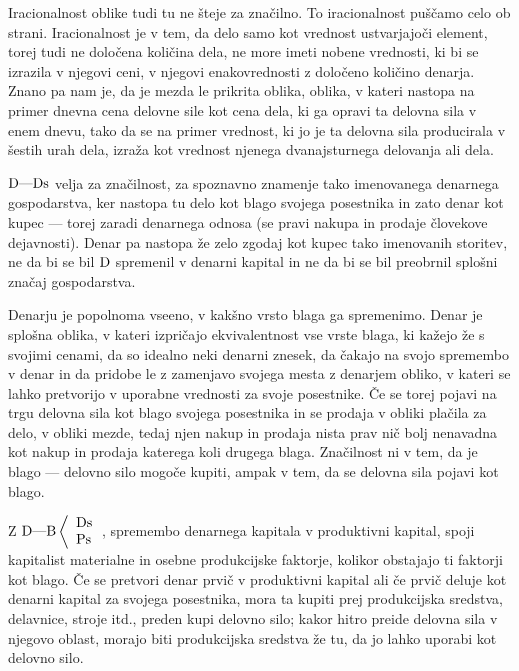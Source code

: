 \documentclass[kapital_02.tex]{subfiles}
\begin{document}
Iracionalnost oblike tudi tu ne šteje za značilno. To iracionalnost puščamo celo ob strani. Iracionalnost je v tem, da delo samo kot vrednost ustvarjajoči element, torej tudi ne določena količina dela, ne more imeti nobene vrednosti, ki bi se izrazila v njegovi ceni, v njegovi enakovrednosti z določeno količino denarja. Znano pa nam je, da je mezda le prikrita oblika, oblika, v kateri nastopa na primer dnevna cena delovne sile kot cena dela, ki ga opravi ta delovna sila v enem dnevu, tako da se na primer vrednost, ki jo je ta delovna sila producirala v šestih urah dela, izraža kot vrednost njenega dvanajsturnega delovanja ali dela.

\( \textrm{D}\textrm{---}\textrm{Ds} \) velja za značilnost, za spoznavno znamenje tako imenovanega denarnega gospodarstva, ker nastopa tu delo kot blago svojega posestnika in zato denar kot kupec --- torej zaradi denarnega odnosa (se pravi nakupa in prodaje človekove dejavnosti). Denar pa nastopa že zelo zgodaj kot kupec tako imenovanih storitev, ne da bi se bil \( \textrm{D} \) spremenil v denarni kapital in ne da bi se bil preobrnil splošni značaj gospodarstva.

Denarju je popolnoma vseeno, v kakšno vrsto blaga ga spremenimo. Denar je splošna oblika, v kateri izpričajo ekvivalentnost vse vrste blaga, ki kažejo že s svojimi cenami, da so idealno neki denarni znesek, da čakajo na svojo spremembo v denar in da pridobe le z zamenjavo svojega mesta z denarjem obliko, v kateri se lahko pretvorijo v uporabne vrednosti za svoje posestnike. Če se torej pojavi na trgu delovna sila kot blago svojega posestnika in se prodaja v obliki plačila za delo, v obliki mezde, tedaj njen nakup in prodaja nista prav nič bolj nenavadna kot nakup in prodaja katerega koli drugega blaga. Značilnost ni v tem, da je blago --- delovno silo mogoče kupiti, ampak v tem, da se delovna sila pojavi kot blago.

Z \( 
    \textrm{D}\textrm{---}\textrm{B}\left< 
    \begin{array}{l}
        \textrm{Ds}\\
        \textrm{Ps}\\
    \end{array}
    \right. 
\), spremembo denarnega kapitala v produktivni kapital, spoji kapitalist materialne in osebne produkcijske faktorje, kolikor obstajajo ti faktorji kot blago. Če se pretvori denar prvič v produktivni kapital ali če prvič deluje kot denarni kapital za svojega posestnika, mora ta kupiti prej produkcijska sredstva, delavnice, stroje itd., preden kupi delovno silo; kakor hitro preide delovna sila v njegovo oblast, morajo biti produkcijska sredstva že tu, da jo lahko uporabi kot delovno silo.
\end{document}

